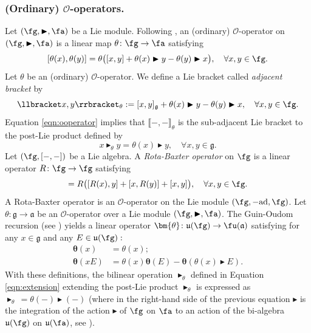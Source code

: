 \documentclass[12pt]{article}
\newcommand{\tht}{\theta}
\newcommand{\btr}{\blacktriangleright}
\newcommand{\mo}{\mathcal{O}}
\begin{document}
\subsubsection{(Ordinary) $\mo$-operators.}
Let $(\fg, \btr, \fa)$ be a  Lie module. Following \cite{K}, an (ordinary) $\mo$-operator on  $(\fg, \btr, \fa)$ is a linear map $\tht \colon \fg \rightarrow \fa$ satisfying
\begin{equation}
\label{eqn:ooperator}
[\theta(x), \theta(y)] = \theta\bigl([x,y] + \tht(x) \btr y - \tht(y) \btr x\bigl), \quad \forall x,y \in \fg.
\end{equation}
Let $\theta$ be an (ordinary) $\mathcal{O}$-operator. We define a Lie bracket called \textit{adjacent bracket} by
\begin{equation}
\llbracket x,y \rrbracket_{\theta} : = [x,y]_{\mathfrak{g}} + \theta(x) \btr y - \theta(y) \btr x, \quad \forall x,y\in \fg.
\end{equation}
Equation \eqref{eqn:ooperator} implies that $\llbracket -,- \rrbracket_{\theta}$ is the sub-adjacent Lie bracket to the post-Lie product defined by
\begin{equation}\label{eq:postlie-from-oop}
x \btr_{\theta} y = \theta(x) \btr y, \quad \forall x,y \in \mathfrak{g}.
\end{equation}
 Let $(\fg,[-,-])$ be a Lie algebra. A \emph{Rota-Baxter operator} on $\fg$ is a linear operator $R\colon \fg \to \fg$ satisfying
\begin{equation*}
[R(x),R(y)] = R\bigl([R(x),y] + [x,R(y)] + [x,y]\bigl), \quad \forall x,y \in \fg.
\end{equation*}
A Rota-Baxter operator is an $\mathcal{O}$-operator on the Lie module $(\fg,{\rm -ad},\fg)$.
Let $\theta\colon \mathfrak{g} \to \mathfrak{a}$ be an $\mathcal{O}$-operator over a Lie module $(\fg,\btr,\fa)$. The Guin-Oudom recursion (see \cite{OG,G}) yields a linear operator 
$\bm{\theta} \colon \mathfrak{u}(\fg) \to \fu(\mathfrak{a})
$ satisfying for any $x \in \mathfrak{g}$ and any $ E \in \mathfrak{u}(\fg):$
\begin{align*}
\bm{\theta}(x) &= \theta(x); \\
\bm{\theta}(xE) &= \theta(x)\bm{\theta}(E) - \bm{\theta}(\theta(x)\btr E).
\end{align*}
With these definitions, the bilinear operation $\btr_{\theta}$ defined in Equation \eqref{eqn:extension} extending the post-Lie product $\btr_{\theta}$ is expressed as
$ \btr_{\theta}\, = {\theta}(-)\btr (-)$ (where in the right-hand side of the previous equation $\btr$ is the integration of the action $\btr$ of $\fg$ on $\fa$ to an action of the bi-algebra $\mathfrak{u}(\fg)$ on $\mathfrak{u}(\fa)$, see \cite{G}).
\end{document}
